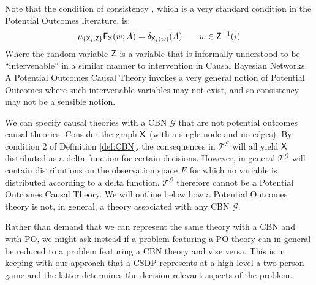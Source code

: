 Note that the condition of consistency \citep{richardson2013single}, which is a very standard condition in the Potential Outcomes literature, is:
\begin{align}
    \mu_{\{\mathsf{X}_i,\mathsf{Z}\}} \mathsf{F}_{\mathsf{X}} (w;A) = \delta_{\mathsf{X}_i(w)} (A) \qquad w\in \mathsf{Z}^{-1}(i)
\end{align}
Where the random variable $\mathsf{Z}$ is a variable that is informally understood to be ``intervenable'' in a similar manner to intervention in Causal Bayesian Networks. A Potential Outcomes Causal Theory invokes a very general notion of Potential Outcomes where such intervenable variables may not exist, and so consistency may not be a sensible notion.

We can specify causal theories with a CBN $\mathcal{G}$ that are not potential outcomes causal theories. Consider the graph $\mathsf{X}$ (with a single node and no edges). By condition 2 of Definition \ref{def:CBN}, the consequences in $\mathscr{T}^{\mathcal{G}}$ will all yield $\mathsf{X}$ distributed as a delta function for certain decisions. However, in general $\mathscr{T}^{\mathcal{G}}$ will contain distributions on the observation space $E$ for which no variable is distributed according to a delta function. $\mathscr{T}^{\mathcal{G}}$ therefore cannot be a Potential Outcomes Causal Theory. We will outline below how a Potential Outcomes theory is not, in general, a theory associated with any CBN $\mathcal{G}$.

Rather than demand that we can represent the same theory with a CBN and with PO, we might ask instead if a problem featuring a PO theory can in general be reduced to a problem featuring a CBN theory and vise versa. This is in keeping with our approach that a CSDP represents at a high level a two person game and the latter determines the decision-relevant aspects of the problem.



